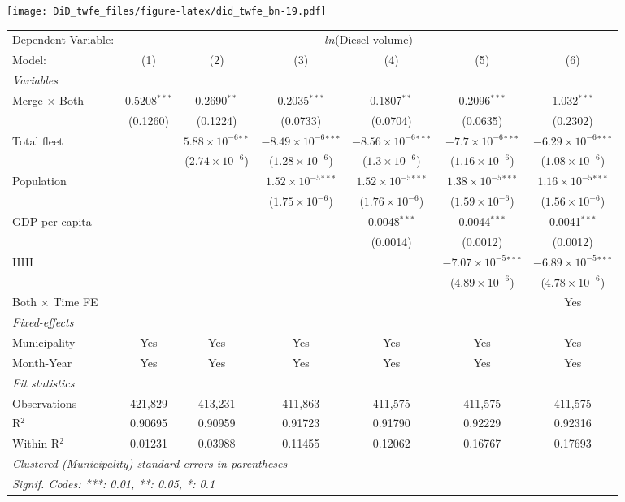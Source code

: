 \documentclass[
]{article}
\begin{document}
\texttt{[image: DiD\_twfe\_files/figure-latex/did\_twfe\_bn-19.pdf]}

\begin{tabular}{lcccccc}
\tabularnewline\midrule\midrule
Dependent Variable:&\multicolumn{6}{c}{$ln$(Diesel volume)}\\
Model:&(1) & (2) & (3) & (4) & (5) & (6)\\
\midrule \emph{Variables}&   &   &   &   &   &  \\
Merge $\times $ Both & 0.5208$^{***}$ & 0.2690$^{**}$ & 0.2035$^{***}$ & 0.1807$^{**}$ & 0.2096$^{***}$ & 1.032$^{***}$\\
  &(0.1260) & (0.1224) & (0.0733) & (0.0704) & (0.0635) & (0.2302)\\
Total fleet &    & $5.88\times 10^{-6}$$^{**}$ & $-8.49\times 10^{-6}$$^{***}$ & $-8.56\times 10^{-6}$$^{***}$ & $-7.7\times 10^{-6}$$^{***}$ & $-6.29\times 10^{-6}$$^{***}$\\
  &   & ($2.74\times 10^{-6}$) & ($1.28\times 10^{-6}$) & ($1.3\times 10^{-6}$) & ($1.16\times 10^{-6}$) & ($1.08\times 10^{-6}$)\\
Population &    &    & $1.52\times 10^{-5}$$^{***}$ & $1.52\times 10^{-5}$$^{***}$ & $1.38\times 10^{-5}$$^{***}$ & $1.16\times 10^{-5}$$^{***}$\\
  &   &    & ($1.75\times 10^{-6}$) & ($1.76\times 10^{-6}$) & ($1.59\times 10^{-6}$) & ($1.56\times 10^{-6}$)\\
GDP per capita &    &    &    & 0.0048$^{***}$ & 0.0044$^{***}$ & 0.0041$^{***}$\\
  &   &    &    & (0.0014) & (0.0012) & (0.0012)\\
HHI &    &    &    &    & $-7.07\times 10^{-5}$$^{***}$ & $-6.89\times 10^{-5}$$^{***}$\\
  &   &    &    &    & ($4.89\times 10^{-6}$) & ($4.78\times 10^{-6}$)\\
Both $\times$ Time FE &  &  &  &  &  & Yes\\
\midrule \emph{Fixed-effects}&   &   &   &   &   &  \\
Municipality & Yes & Yes & Yes & Yes & Yes & Yes\\
Month-Year & Yes & Yes & Yes & Yes & Yes & Yes\\
\midrule \emph{Fit statistics}&  & & & & & \\
Observations & 421,829&413,231&411,863&411,575&411,575&411,575\\
R$^2$ & 0.90695&0.90959&0.91723&0.91790&0.92229&0.92316\\
Within R$^2$ & 0.01231&0.03988&0.11455&0.12062&0.16767&0.17693\\
\midrule\midrule\multicolumn{7}{l}{\emph{Clustered (Municipality) standard-errors in parentheses}}\\
\multicolumn{7}{l}{\emph{Signif. Codes: ***: 0.01, **: 0.05, *: 0.1}}\\
\end{tabular}
\end{document}
